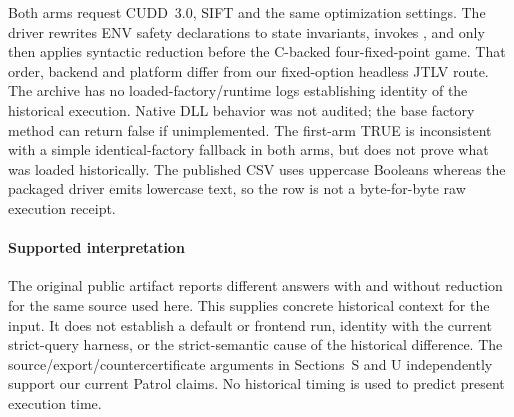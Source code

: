 Both arms request CUDD~3.0, SIFT and the same optimization settings.
The driver rewrites ENV safety declarations to state invariants,
invokes , and only then applies syntactic
reduction before the C-backed four-fixed-point game.
That order, backend and platform differ from our fixed-option headless
JTLV route. The archive has no loaded-factory/runtime logs establishing
identity of the historical execution. Native DLL behavior was not audited;
the base factory method can return false if unimplemented.
The first-arm TRUE is inconsistent with a simple identical-factory
fallback in both arms, but does not prove what was loaded historically.
The published CSV uses uppercase Booleans whereas the packaged driver
emits lowercase text, so the row is not a byte-for-byte raw execution receipt.

\paragraph{Supported interpretation}
The original public artifact reports different answers with and without
reduction for the same source used here. This supplies concrete historical
context for the input. It does not establish a default or frontend run,
identity with the current strict-query harness, or the strict-semantic
cause of the historical difference. The source/export/countercertificate
arguments in Sections~S and U independently support our current Patrol
claims. No historical timing is used to predict present execution time.
